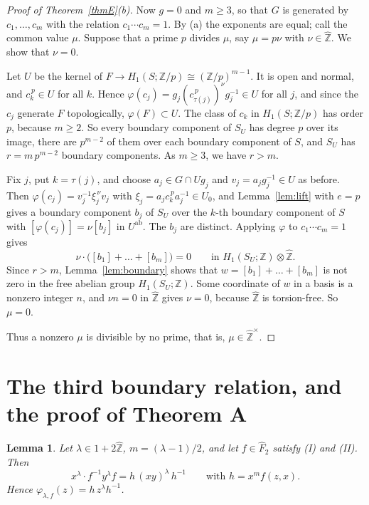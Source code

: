 \documentclass[11pt]{amsart}
\newtheorem{lemma}[thm]{Lemma}
\theoremstyle{definition}
\theoremstyle{remark}
\newcommand{\Z}{\mathbb Z}
\newcommand{\Zh}{\widehat{\mathbb Z}}
\newcommand{\Fh}{\widehat F}
\newcommand{\ab}{\mathrm{ab}}
\newcommand{\ph}{\varphi}
\begin{document}
\begin{proof}[Proof of Theorem~\ref{thmE}(b)]
Now $g=0$ and $m\ge3$, so that $G$ is generated by $c_1,\dots,c_m$ with the relation $c_1\cdots c_m=1$. By (a) the exponents are equal; call the common value $\mu$. Suppose that a prime $p$ divides $\mu$, say $\mu=p\nu$ with $\nu\in\Zh$. We show that $\nu=0$.

Let $U$ be the kernel of $F\to H_1(S;\Z/p)\cong(\Z/p)^{m-1}$. It is open and normal, and $c_k^{\,p}\in U$ for all $k$. Hence $\ph(c_j)=g_j(c_{\tau(j)}^{\,p})^{\nu}g_j^{-1}\in U$ for all $j$, and since the $c_j$ generate $F$ topologically, $\ph(F)\subset U$. The class of $c_k$ in $H_1(S;\Z/p)$ has order $p$, because $m\ge2$. So every boundary component of $S_U$ has degree $p$ over its image, there are $p^{m-2}$ of them over each boundary component of $S$, and $S_U$ has $r=m\,p^{m-2}$ boundary components. As $m\ge3$, we have $r>m$.

Fix $j$, put $k=\tau(j)$, and choose $a_j\in G\cap Ug_j$ and $v_j=a_jg_j^{-1}\in U$ as before. Then $\ph(c_j)=v_j^{-1}\xi_j^{\,\nu}v_j$ with $\xi_j=a_jc_k^{\,p}a_j^{-1}\in U_0$, and Lemma~\ref{lem:lift} with $e=p$ gives a boundary component $b_j$ of $S_U$ over the $k$-th boundary component of $S$ with $[\ph(c_j)]=\nu[b_j]$ in $U^{\ab}$. The $b_j$ are distinct. Applying $\ph$ to $c_1\cdots c_m=1$ gives
\[
 \nu\cdot\bigl([b_1]+\dots+[b_m]\bigr)=0\qquad\text{in }H_1(S_U;\Z)\otimes\Zh .
\]
Since $r>m$, Lemma~\ref{lem:boundary} shows that $w=[b_1]+\dots+[b_m]$ is not zero in the free abelian group $H_1(S_U;\Z)$. Some coordinate of $w$ in a basis is a nonzero integer $n$, and $\nu n=0$ in $\Zh$ gives $\nu=0$, because $\Zh$ is torsion-free. So $\mu=0$.

Thus a nonzero $\mu$ is divisible by no prime, that is, $\mu\in\Zh^\times$.
\end{proof}

\section{The third boundary relation, and the proof of Theorem A}\label{sec:pairs}

\begin{lemma}\label{lem:third}
Let $\lambda\in1+2\Zh$, $m=(\lambda-1)/2$, and let $f\in\Fh_2$ satisfy \textup{(I)} and \textup{(II)}. Then
\[
 x^{\lambda}\cdot f^{-1}y^{\lambda}f=h\,(xy)^{\lambda}\,h^{-1}\qquad\text{with }h=x^{m}f(z,x).
\]
Hence $\ph_{\lambda,f}(z)=h\,z^{\lambda}h^{-1}$.
\end{lemma}
\end{document}
